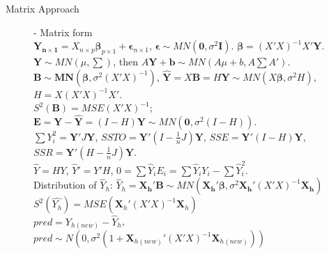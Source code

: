\documentclass[10pt,landscape]{article}
\begin{document}
\begin{multicols}{3}
    
    
    
    \begin{description}
    		\item[Matrix Approach] - Matrix form \\ %
    		$\mathbf{Y_{n\times 1}} = X_{n\times p}\boldsymbol{\beta}_{p\times 1}+\boldsymbol{\epsilon}_{n\times 1}$, $\boldsymbol{\epsilon}\sim	MN(\textbf{0}, \sigma^2\textbf{I})$. $\boldsymbol{\beta} = (X'X)^{-1}X'\boldsymbol{Y}$. \\
    		$\boldsymbol{Y} \sim MN(\mu, \sum)$, then $A\boldsymbol{Y} + \boldsymbol{b} \sim MN(A\mu+b, A\sum A')$. \\
    		$\boldsymbol{B}\sim \boldsymbol{MN}(\boldsymbol{\beta}, \sigma^2(X'X)^{-1})$, $\boldsymbol{\hat{Y}} = X\textbf{B} = H\boldsymbol{Y}\sim MN(X\boldsymbol{\beta}, \sigma^2H)$, $H=X(X'X)^{-1}X'$.\\
    		$S^2(\boldsymbol{B}) = MSE(X'X)^{-1}$; $\boldsymbol{E} = \boldsymbol{Y} - \boldsymbol{\hat{Y}} = (I - H)\boldsymbol{Y} \sim	MN(\boldsymbol{0}, \sigma^2(I-H))$.\\
    		$\sum Y_i^2 = \boldsymbol{Y}'J\boldsymbol{Y}$, $SSTO = \boldsymbol{Y}'(I - \frac{1}{n}J)\boldsymbol{Y}$, $SSE = \boldsymbol{Y}'(I-H)\boldsymbol{Y}$, $SSR = \boldsymbol{Y}'(H-\frac{1}{n}J)\boldsymbol{Y}$.\\
    		$\hat{Y} = HY$, $\hat{Y}' = Y'H$, $0 = \sum \hat{Y}_iE_i = \sum \hat{Y}_i Y_i - \sum \hat{Y}_i^2$. \\
    		Distribution of $\hat{Y}_h$: $\hat{Y}_h = \boldsymbol{X_h'B}\sim MN(\boldsymbol{X_h'\beta}, \sigma^2\boldsymbol{X_h'}(X'X)^{-1}\boldsymbol{X_h})$ \\
    		$S^2(\hat{Y_h}) = MSE(\boldsymbol{X}_h'(X'X)^{-1}\boldsymbol{X}_h)$ \\
    		$pred = Y_{h(new)} - \hat{Y}_h$, $pred \sim N(0, \sigma^2(1 + \boldsymbol{X}_{h(new)}'(X'X)^{-1}\boldsymbol{X}_{h(new)}))$
    		

\end{description}
\end{multicols}
\end{document}

